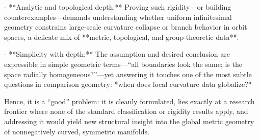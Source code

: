 - **Analytic and topological depth:** Proving such rigidity—or building counterexamples—demands understanding whether uniform infinitesimal geometry constrains large-scale curvature collapse or branch behavior in orbit spaces, a delicate mix of **metric, topological, and group-theoretic data**.  

- **Simplicity with depth:** The assumption and desired conclusion are expressible in simple geometric terms—“all boundaries look the same; is the space radially homogeneous?”—yet answering it touches one of the most subtle questions in comparison geometry: *when does local curvature data globalize?*  

Hence, it is a “good” problem: it is cleanly formulated, lies exactly at a research frontier where none of the standard classification or rigidity results apply, and addressing it would yield new structural insight into the global metric geometry of nonnegatively curved, symmetric manifolds.